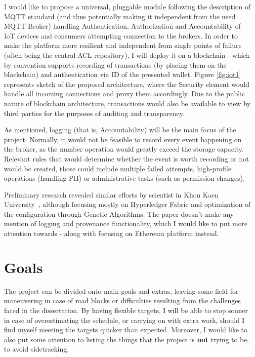 \documentclass[a4paper,12pt]{article}
\begin{document}
I would like to propose a universal, pluggable module following the description of MQTT standard (and thus potentially making it independent from the used MQTT Broker) handling Authentication, Authorization and Accountability of IoT devices and consumers attempting connection to the brokers. In order to make the platform more resilient and independent from single points of failure (often being the central ACL repository), I will deploy it on a blockchain - which by convention supports recording of transactions (by placing them on the blockchain) and authentication via ID of the presented wallet. Figure \ref{fig:iot1} represents sketch of the proposed architecture, where the Security element would handle all incoming connections and proxy them accordingly. Due to the public nature of blockchain architecture, transactions would also be available to view by third parties for the purposes of auditing and transparency.

As mentioned, logging (that is, Accountability) will be the main focus of the project. Normally, it would not be feasible to record every event happening on the broker, as the number operation would greatly exceed the storage capacity. Relevant rules that would determine whether the event is worth recording or not would be created, those could include multiple failed attempts, high-profile operations (handling PII) or administrative tasks (such as permission changes).

Preliminary research revealed similar efforts by scientist in Khon Kaen University~\cite{8523942}, although focusing mostly on Hyperledger Fabric and optimization of the configuration through Genetic Algorithms. The paper doesn't make any mention of logging and provenance functionality, which I would like to put more attention towards - along with focusing on Ethereum platform instead.


\section*{Goals}

The project can be divided onto main goals and extras, leaving some field for maneuvering in case of road blocks or difficulties resulting from the challenges faced in the dissertation. By having flexible targets, I will be able to stop sooner in case of overestimating the schedule, or carrying on with extra work, should I find myself meeting the targets quicker than expected. Moreover, I would like to also put some attention to listing the things that the project is \textbf{not} trying to be, to avoid sidetracking.
\end{document}
